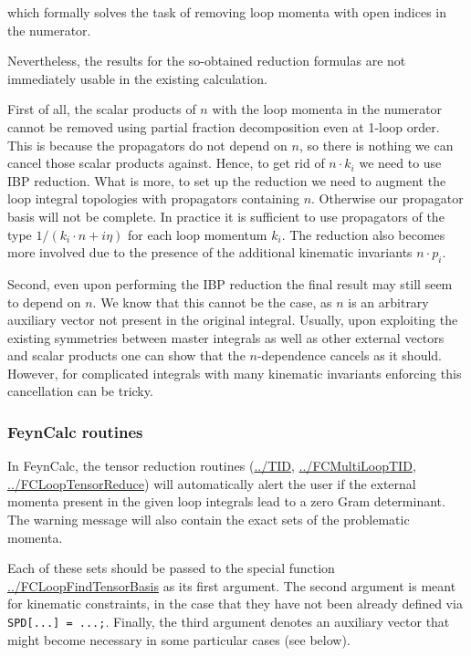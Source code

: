 \documentclass[../FeynCalcManual.tex]{subfiles}
\begin{document}
which formally solves the task of removing loop momenta with open
indices in the numerator.

Nevertheless, the results for the so-obtained reduction formulas are not
immediately usable in the existing calculation.

First of all, the scalar products of \(n\) with the loop momenta in the
numerator cannot be removed using partial fraction decomposition even at
1-loop order. This is because the propagators do not depend on \(n\), so
there is nothing we can cancel those scalar products against. Hence, to
get rid of \(n \cdot k_i\) we need to use IBP reduction. What is more,
to set up the reduction we need to augment the loop integral topologies
with propagators containing \(n\). Otherwise our propagator basis will
not be complete. In practice it is sufficient to use propagators of the
type \(1/(k_i \cdot n + i \eta)\) for each loop momentum \(k_i\). The
reduction also becomes more involved due to the presence of the
additional kinematic invariants \(n \cdot p_i\).

Second, even upon performing the IBP reduction the final result may
still seem to depend on \(n\). We know that this cannot be the case, as
\(n\) is an arbitrary auxiliary vector not present in the original
integral. Usually, upon exploiting the existing symmetries between
master integrals as well as other external vectors and scalar products
one can show that the \(n\)-dependence cancels as it should. However,
for complicated integrals with many kinematic invariants enforcing this
cancellation can be tricky.

\subsubsection{FeynCalc routines}\label{feyncalc-routines}

In FeynCalc, the tensor reduction routines (\hyperlink{../tid}{../TID},
\hyperlink{../fcmultilooptid}{../FCMultiLoopTID},
\hyperlink{../fclooptensorreduce}{../FCLoopTensorReduce}) will
automatically alert the user if the external momenta present in the
given loop integrals lead to a zero Gram determinant. The warning
message will also contain the exact sets of the problematic momenta.

Each of these sets should be passed to the special function
\hyperlink{../fcloopfindtensorbasis}{../FCLoopFindTensorBasis} as its
first argument. The second argument is meant for kinematic constraints,
in the case that they have not been already defined via
\texttt{SPD[\allowbreak{}...] = ...;}. Finally, the third argument
denotes an auxiliary vector that might become necessary in some
particular cases (see below).
\end{document}
